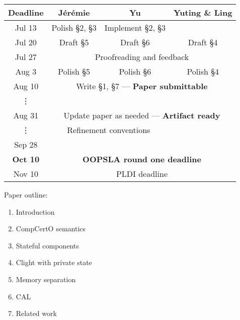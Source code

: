 \documentclass[serif,aspectratio=169]{beamer}
\begin{document}
  \begin{frame}
    \begin{center}
      \begin{tabular}{cccc}
        \toprule
        Deadline & J\'er\'emie & Yu & Yuting \& Ling \\
        \midrule
        Jul 13 &
          Polish \S2, \S3 &
          Implement \S2, \S3 &
          \cellcolor{lightgray!25} \\
        Jul 20 &
          Draft \S5 &
          Draft \S6 &
          Draft \S4 \\
        Jul 27 &
          \multicolumn{3}{c}{
            \cellcolor{lightgray!50}
            Proofreading and feedback} \\
        Aug 3 &
          Polish \S5 &
          Polish \S6 &
          Polish \S4
          \\
        Aug 10 &
          \multicolumn{3}{c}{
            \cellcolor{lightgray!50}
            Write \S1, \S7 --- \bf Paper submittable} \\
        \vdots &
          \multicolumn{3}{c}{
            \raisebox{0.5ex}{Implementation}} \\
        Aug 31 &
          \multicolumn{3}{c}{
            \cellcolor{lightgray!50}
            Update paper as needed --- \bf Artifact ready
            } \\
        \midrule
        \vdots &
          \multicolumn{2}{c}{
            Refinement conventions} &
          \cellcolor{lightgray!25}
          \\
        Sep 28 &
          \multicolumn{2}{c}{ } &
          \cellcolor{lightgray!25}
          \\
        \midrule
        \bf Oct 10 &
          \multicolumn{3}{c}{\bf OOPSLA round one deadline} \\
        Nov 10 &
          \multicolumn{3}{c}{PLDI deadline} \\
        \bottomrule
      \end{tabular}%
      \hspace{2em}%
      \begin{minipage}{8em}
        Paper outline:
        \begin{enumerate}
          \item Introduction
          \item CompCertO semantics
          \item Stateful components
          \item Clight with private state
          \item Memory separation
          \item CAL
          \item Related work
        \end{enumerate}
      \end{minipage}
    \end{center}
  \end{frame}
\end{document}
